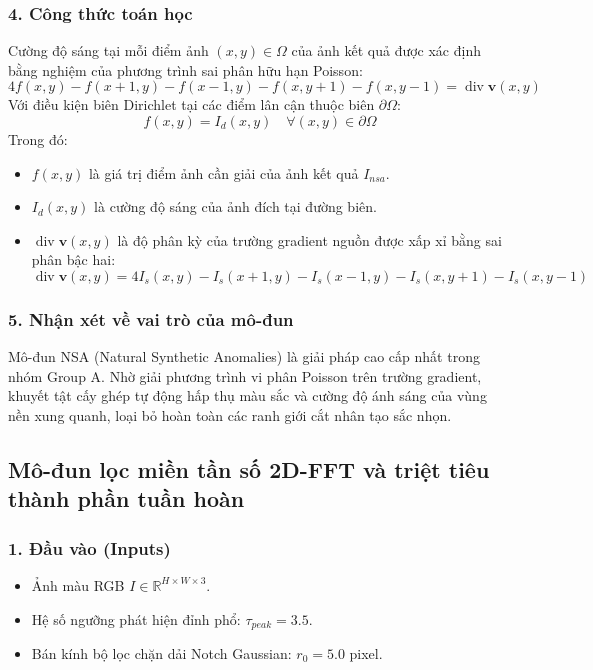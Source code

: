 \subsubsection*{4. Công thức toán học}
Cường độ sáng tại mỗi điểm ảnh $(x, y) \in \Omega$ của ảnh kết quả được xác định bằng nghiệm của phương trình sai phân hữu hạn Poisson:
\begin{equation}
    4 f(x, y) - f(x+1, y) - f(x-1, y) - f(x, y+1) - f(x, y-1) = \operatorname{div}\mathbf{v}(x, y)
\end{equation}
Với điều kiện biên Dirichlet tại các điểm lân cận thuộc biên $\partial\Omega$:
\begin{equation}
    f(x, y) = I_d(x, y) \quad \forall (x, y) \in \partial\Omega
\end{equation}
Trong đó:
\begin{itemize}
    \item $f(x, y)$ là giá trị điểm ảnh cần giải của ảnh kết quả $I_{nsa}$.
    \item $I_d(x, y)$ là cường độ sáng của ảnh đích tại đường biên.
    \item $\operatorname{div}\mathbf{v}(x, y)$ là độ phân kỳ của trường gradient nguồn được xấp xỉ bằng sai phân bậc hai:
    $$\operatorname{div}\mathbf{v}(x, y) = 4 I_s(x, y) - I_s(x+1, y) - I_s(x-1, y) - I_s(x, y+1) - I_s(x, y-1)$$
\end{itemize}

\subsubsection*{5. Nhận xét về vai trò của mô-đun}
Mô-đun NSA (Natural Synthetic Anomalies) là giải pháp cao cấp nhất trong nhóm Group A. Nhờ giải phương trình vi phân Poisson trên trường gradient, khuyết tật cấy ghép tự động hấp thụ màu sắc và cường độ ánh sáng của vùng nền xung quanh, loại bỏ hoàn toàn các ranh giới cắt nhân tạo sắc nhọn.

\subsection{Mô-đun lọc miền tần số 2D-FFT và triệt tiêu thành phần tuần hoàn}

\subsubsection*{1. Đầu vào (Inputs)}
\begin{itemize}
    \item Ảnh màu RGB $I \in \mathbb{R}^{H \times W \times 3}$.
    \item Hệ số ngưỡng phát hiện đỉnh phổ: $\tau_{peak} = 3.5$.
    \item Bán kính bộ lọc chặn dải Notch Gaussian: $r_0 = 5.0$ pixel.
\end{itemize}

